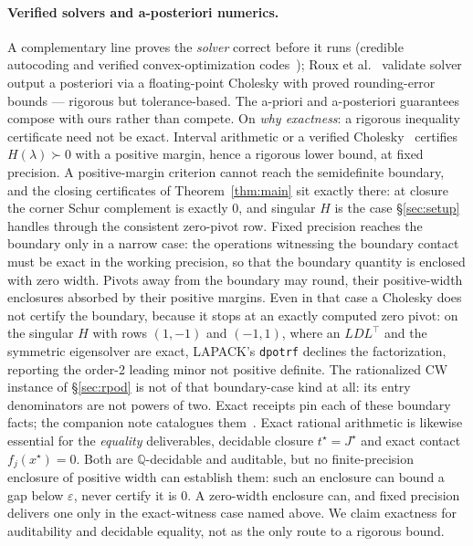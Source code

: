 \documentclass[11pt]{article}
\theoremstyle{definition}
\theoremstyle{remark}
\newcommand{\Q}{\mathbb{Q}}
\renewcommand{\_}{\ifdim\fontdimen3\font=0pt\relax\char`\_\else\textunderscore\fi\hspace{0pt}}
\begin{document}
\paragraph{Verified solvers and a-posteriori numerics.} A complementary line
proves the \emph{solver} correct before it runs (credible autocoding and
verified convex-optimization codes~\cite{wang2014,davy2018,cohen2020}); Roux
et al.~\cite{roux2018} validate solver output a posteriori via a
floating-point Cholesky with proved rounding-error bounds --- rigorous but
tolerance-based. The a-priori and a-posteriori guarantees compose with ours
rather than compete. On \emph{why exactness}: a rigorous inequality
certificate need not be exact. Interval arithmetic or a verified
Cholesky~\cite{jansson2009,roux2018} certifies $H(\lambda)\succ0$ with a
positive margin, hence a rigorous lower bound, at fixed precision. A
positive-margin criterion cannot reach the semidefinite boundary, and the
closing certificates of Theorem~\ref{thm:main} sit exactly there: at closure
the corner Schur complement is exactly $0$, and singular $H$ is the case
\S\ref{sec:setup} handles through the consistent zero-pivot row. Fixed
precision reaches the boundary only in a narrow case: the operations
witnessing the boundary contact must be exact in the working precision, so
that the boundary quantity is enclosed with zero width. Pivots away from the
boundary may round, their positive-width enclosures absorbed by their
positive margins. Even in that case a Cholesky does not certify the
boundary, because it stops at an exactly computed zero pivot: on the
singular $H$ with rows $(1,-1)$ and $(-1,1)$, where an $LDL^\top$ and the
symmetric eigensolver are exact, LAPACK's \texttt{dpotrf} declines the
factorization, reporting the order-2 leading minor not positive definite.
The rationalized CW instance of \S\ref{sec:rpod} is not of that
boundary-case kind at all: its entry denominators are not powers of two.
Exact receipts pin each of these boundary facts; the companion note
catalogues them~\cite{leannote}. Exact rational
arithmetic is likewise essential for the \emph{equality} deliverables,
decidable closure $t^\star=J^\star$ and exact contact $f_j(x^\star)=0$. Both
are $\Q$-decidable and auditable, but no finite-precision enclosure of
positive width can establish them: such an enclosure can bound a gap below
$\varepsilon$, never certify it is $0$. A zero-width enclosure can, and
fixed precision delivers one only in the exact-witness case named above. We
claim exactness for auditability and decidable equality, not as the only
route to a rigorous bound.
\end{document}
